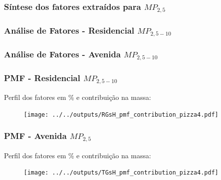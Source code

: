 \begin{frame}
  \frametitle{Síntese dos fatores extraídos para $MP_{2,5}$}
  \begin{table}[H]
    \centering
    \tiny
    
  \end{table}
  
    \begin{table}[H]
    	\centering
    	\tiny
    	
    \end{table}
\end{frame}

\begin{frame}
  \frametitle{Análise de Fatores - Residencial $MP_{2,5-10}$}        
  \begin{table}[H]
    \centering
    \tiny
    
  \end{table}
\end{frame}

\begin{frame}
  \frametitle{Análise de Fatores - Avenida $MP_{2,5-10}$}    
  \begin{table}[H]
    \centering
    \tiny
    
  \end{table}
\end{frame}

\begin{frame}
  \frametitle{PMF - Residencial $MP_{2,5-10}$}
  Perfil dos fatores em \% e contribuição na massa:
    \begin{figure}
      \centering
            \begin{minipage}[b]{0.4\linewidth}
              \tiny
              
            \end{minipage}
                  \hspace{3cm}
      \begin{minipage}[b]{0.3\linewidth}
        \texttt{[image: ../../outputs/RGsH\_pmf\_contribution\_pizza4.pdf]}
      \end{minipage}%
    \end{figure}
\end{frame}

\begin{frame}
  \frametitle{PMF - Avenida $MP_{2,5}$}
  Perfil dos fatores em \% e contribuição na massa:
    \begin{figure}
      \centering
            \begin{minipage}[b]{0.4\linewidth}
              \tiny
              
            \end{minipage}
                  \hspace{3cm}
      \begin{minipage}[b]{0.3\linewidth}
        \texttt{[image: ../../outputs/TGsH\_pmf\_contribution\_pizza4.pdf]}
      \end{minipage}%
    \end{figure}
\end{frame}

